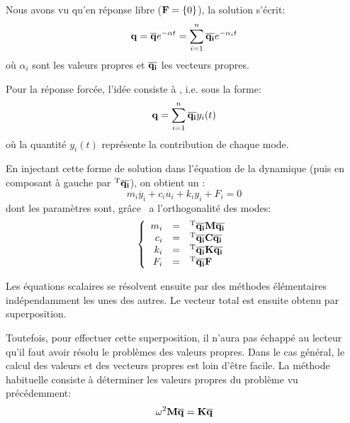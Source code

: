 \medskip
Nous avons vu qu'en réponse libre ($\mathbf{F}=\{0\}$), la solution s'écrit:
\begin{equation} \mathbf{q} = \mathbf{\overline{q}} e^{-\alpha t} = \displaystyle\sum_{i=1}^n \mathbf{\overline{q_i}} e^{-\alpha_i t} \end{equation}
où $\alpha_i$ sont les valeurs propres et $\mathbf{\overline{q_i}}$ les vecteurs propres.

\medskip
Pour la réponse forcée, l'idée consiste à , i.e. sous la forme:
\begin{equation} \mathbf{q} = \displaystyle\sum_{i=1}^n \mathbf{\overline{q_i}} y_i(t) \end{equation}
où la quantité $y_i(t)$ représente la contribution de chaque mode. 

En injectant cette forme de solution dans l'équation de la dynamique (puis en composant à gauche par 
${}^\mathrm{T}\mathbf{\overline{q_i}}$), on obtient un :
\begin{equation} m_i\ddot{y_i}+c_i\dot{u_i}+k_iy_i+F_i = 0 \end{equation}
dont les paramètres sont, grâce \ a l'orthogonalité des modes:
\begin{equation}\left\{
\begin{array}{rcl}
	m_i &=& {}^\mathrm{T}\mathbf{\overline{q_i}}\mathbf{M}\mathbf{\overline{q_i}}\\
	c_i &=& {}^\mathrm{T}\mathbf{\overline{q_i}}\mathbf{C}\mathbf{\overline{q_i}}\\
	k_i &=& {}^\mathrm{T}\mathbf{\overline{q_i}}\mathbf{K}\mathbf{\overline{q_i}}\\
	F_i &=& {}^\mathrm{T}\mathbf{\overline{q_i}}\mathbf{F}
\end{array}
\right.\end{equation}

Les équations scalaires se résolvent ensuite par des méthodes élémentaires indépendamment
les unes des autres. Le vecteur total est ensuite obtenu par superposition.

\medskip
Toutefois, pour effectuer cette superposition, il n'aura pas échappé au lecteur qu'il faut
avoir résolu le problèmes des valeurs propres.
Dans le cas général, le calcul des valeurs et des vecteurs propres  est loin 
d'être facile.
La méthode habituelle consiste à déterminer les valeurs propres  du 
problème vu précédemment:
\begin{equation} \omega^2\mathbf{M}\mathbf{\overline{q}}=\mathbf{K}\mathbf{\overline{q}} \end{equation}

